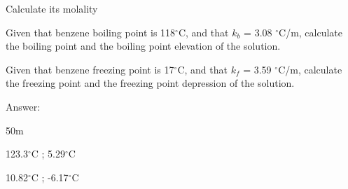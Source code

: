 \documentclass[main.tex]{subfiles}
\begin{document}
\begin{description}
\begin{example}
\begin{inparaenum}[(a)]	
\item Calculate its molality %
\item	 Given that benzene boiling point is 118$^{\circ}$C, and that $k_b$ = 3.08 $^{\circ}$C/m, calculate the boiling point and the boiling point elevation of the solution.  
\item	 Given that benzene freezing point is 17$^{\circ}$C, and that $k_f$ = 3.59 $^{\circ}$C/m, calculate the freezing point and the freezing point depression of the solution.   
\end{inparaenum}
\begin{flushright} Answer: 
\begin{inparaenum}[(a)]	
\item  50m  
\item	  123.3$^{\circ}$C ; 5.29$^{\circ}$C
\item	  10.82$^{\circ}$C ; -6.17$^{\circ}$C
\end{inparaenum}
\end{flushright}
\end{example}%






\end{description}
\end{document}

